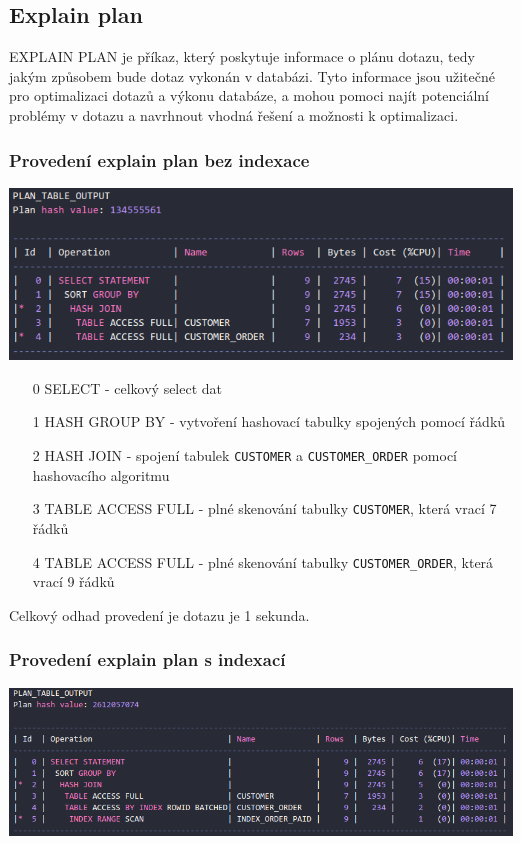 \documentclass[a4paper, 12pt]{article}
\begin{document}
\subsection{Explain plan}
EXPLAIN PLAN je příkaz, který poskytuje informace o plánu dotazu, tedy jakým způsobem bude dotaz vykonán v databázi. Tyto informace jsou užitečné pro optimalizaci dotazů a výkonu databáze, a mohou pomoci najít potenciální problémy v dotazu a navrhnout vhodná řešení a možnosti k optimalizaci.

\subsubsection{Provedení explain plan bez indexace}
\begin{center}
    \includegraphics[scale=0.70]{img/explain_plan_without_index.png}
\end{center}
\begin{itemize}
    \item[0] SELECT - celkový select dat
    \item[1] HASH GROUP BY - vytvoření hashovací tabulky spojených pomocí řádků
    \item[2] HASH JOIN - spojení tabulek \texttt{CUSTOMER} a \texttt{CUSTOMER\_ORDER} pomocí hashovacího algoritmu
    \item[3] TABLE ACCESS FULL -  plné skenování tabulky \texttt{CUSTOMER}, která vrací 7 řádků
    \item[4] TABLE ACCESS FULL - plné skenování tabulky \texttt{CUSTOMER\_ORDER}, která vrací 9 řádků
\end{itemize}

Celkový odhad provedení je dotazu je 1 sekunda.
\newpage
\subsubsection{Provedení explain plan s indexací}
\begin{center}
    \includegraphics[scale=0.55]{img/explain_plan_with_index.png}
\end{center}
\end{document}
